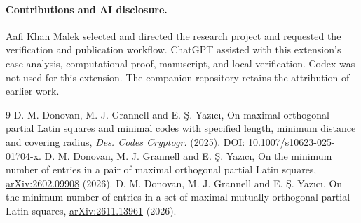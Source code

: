 \documentclass[11pt,letterpaper]{article}
\begin{document}
\paragraph{Contributions and AI disclosure.}
Aafi Khan Malek selected and directed the research project and requested
the verification and publication workflow. ChatGPT assisted with this
extension's case analysis, computational proof, manuscript, and local
verification. Codex was not used for this extension. The companion
repository retains the attribution of earlier work.

\begin{thebibliography}{9}
 D. M. Donovan, M. J. Grannell and E. \c{S}. Yaz\i c\i,
On maximal orthogonal partial Latin squares and minimal codes with
specified length, minimum distance and covering radius,
\emph{Des. Codes Cryptogr.} (2025).
\href{https://doi.org/10.1007/s10623-025-01704-x}{DOI: 10.1007/s10623-025-01704-x}.
 D. M. Donovan, M. J. Grannell and E. \c{S}. Yaz\i c\i,
On the minimum number of entries in a pair of maximal orthogonal partial
Latin squares, \href{https://arxiv.org/abs/2602.09908}{arXiv:2602.09908} (2026).
 D. M. Donovan, M. J. Grannell and E. \c{S}. Yaz\i c\i,
On the minimum number of entries in a set of maximal mutually orthogonal
partial Latin squares, \href{https://arxiv.org/abs/2611.13961}{arXiv:2611.13961} (2026).
\end{thebibliography}
\end{document}
